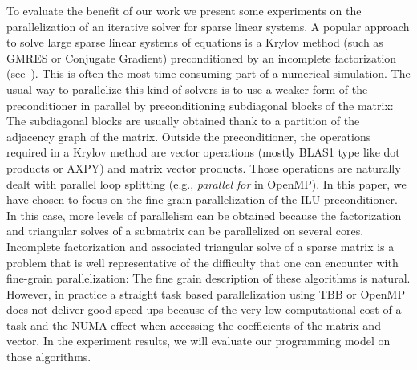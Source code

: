 To evaluate the benefit of our work we present some experiments on the
parallelization of an iterative solver for sparse linear systems. A popular
approach to solve large sparse linear systems of equations is a Krylov
method (such as GMRES or Conjugate Gradient) preconditioned by an incomplete
factorization (see~\cite{Saad96IMSLS}).
This is often the most time consuming part of a numerical simulation.
The usual way to parallelize this kind of solvers is to use a weaker form of
the preconditioner in parallel by preconditioning subdiagonal blocks of the
matrix: The subdiagonal blocks are usually obtained thank to a partition of
the adjacency graph of the matrix.
Outside the preconditioner, the operations required in a Krylov method are
vector operations (mostly BLAS1 type like dot products or AXPY) and matrix %
vector products. Those operations are naturally dealt with parallel loop
splitting  (e.g., {\em parallel for} in OpenMP).
In this paper, we have chosen to focus on the fine grain parallelization of
the ILU preconditioner.
In this case, more levels of parallelism can be obtained because the factorization
and triangular solves of a submatrix can be parallelized on several cores.
Incomplete factorization and associated triangular solve of a sparse matrix
is a problem that is well representative of the difficulty that one can encounter
with fine-grain parallelization: The fine grain description of these algorithms
is natural. However, in practice a straight task based parallelization using TBB or
OpenMP does not deliver good speed-ups because of the very low computational cost of
a task and the NUMA effect when accessing the coefficients of the matrix and vector.
In the experiment results, we will evaluate our programming model on those algorithms.




